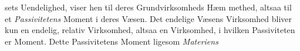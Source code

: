 \documentclass[12pt,a4paper]{book}
\begin{document}
sets Uendelighed, viser hen til deres Grundvirksomheds Hæm\-%
methed, altsaa til et \emph{Passivitetens} Moment i deres Væsen.
Det endelige Væsens Virksomhed bliver kun en endelig, relativ
Virksomhed, altsaa en Virksomhed, i hvilken Passiviteten er
Moment. Dette Passivitetens Moment ligesom \emph{Materiens}
%
%
\end{document}
